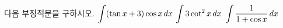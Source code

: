 다음 부정적분을 구하시오.
 $\displaystyle\int (\tan x+3)\cos x\mkern3mu dx$
 $\displaystyle\int 3\cot^2 x\mkern3mu dx$
 $\displaystyle\int \dfrac{1}{1+\cos x}\mkern3mu dx$
